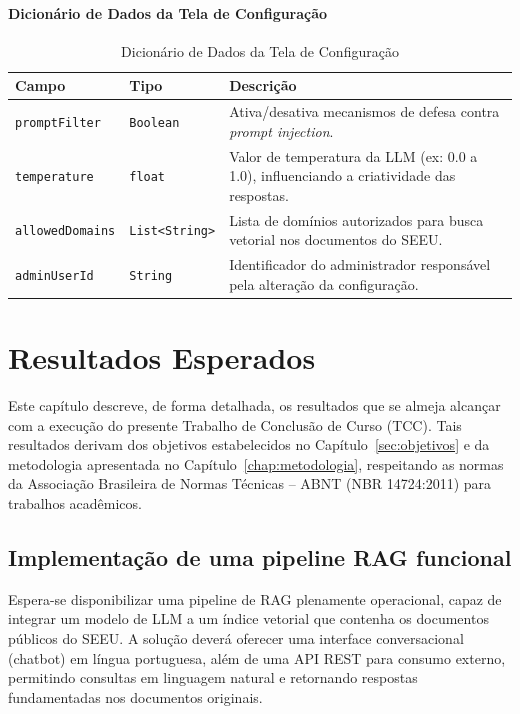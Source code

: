 \begin{description}
\subsubsection{Dicionário de Dados da Tela de Configuração}

\begin{table}[H]
  \centering
  \caption{Dicionário de Dados da Tela de Configuração}
  \label{tab:dd_tela_configuracao}
  \begin{tabular}{|p{3cm}|p{4cm}|p{8cm}|}
    \hline
    \textbf{Campo} & \textbf{Tipo} & \textbf{Descrição} \\ \hline
    \texttt{promptFilter} & \texttt{Boolean} & Ativa/desativa mecanismos de defesa contra \emph{prompt injection}. \\ \hline
    \texttt{temperature} & \texttt{float} & Valor de temperatura da LLM (ex: 0.0 a 1.0), influenciando a criatividade das respostas. \\ \hline
    \texttt{allowedDomains} & \texttt{List<String>} & Lista de domínios autorizados para busca vetorial nos documentos do SEEU. \\ \hline
    \texttt{adminUserId} & \texttt{String} & Identificador do administrador responsável pela alteração da configuração. \\ \hline
  \end{tabular}
\end{table}



\chapter{Resultados Esperados}
\label{chap:resultados}

Este capítulo descreve, de forma detalhada, os resultados que se almeja alcançar com a execução do presente Trabalho de Conclusão de Curso (TCC). Tais resultados derivam dos objetivos estabelecidos no Capítulo~\ref{sec:objetivos} e da metodologia apresentada no Capítulo~\ref{chap:metodologia}, respeitando as normas da Associação Brasileira de Normas Técnicas -- ABNT (NBR 14724:2011) para trabalhos acadêmicos.

\section{Implementação de uma pipeline RAG funcional}
Espera-se disponibilizar uma pipeline de RAG plenamente operacional, capaz de integrar um modelo de LLM a um índice vetorial que contenha os documentos públicos do SEEU. A solução deverá oferecer uma interface conversacional (chatbot) em língua portuguesa, além de uma API REST para consumo externo, permitindo consultas em linguagem natural e retornando respostas fundamentadas nos documentos originais.


\end{description}
